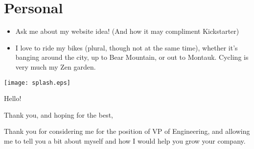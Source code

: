 \begin{cvcolumns}
\end{cvcolumns}


\section{Personal}
\begin{itemize}
    \item Ask me about my website idea!  (And how it may compliment Kickstarter)
    \item I love to ride my bikes (plural, though not at the same time), whether it's banging around the city, up to Bear Mountain, or out to Montauk.  Cycling is very much my Zen garden.
\end{itemize}
\centerline{\texttt{[image: splash.eps]}}


\clearpage
{}
\date{August 10, 2014}
\opening{Hello!}

\closing{Thank you, and hoping for the best,}
\makelettertitle
Thank you for considering me for the position of VP of Engineering, and allowing me to tell you a bit about myself and how I would help you grow your company.

\makeletterclosing


